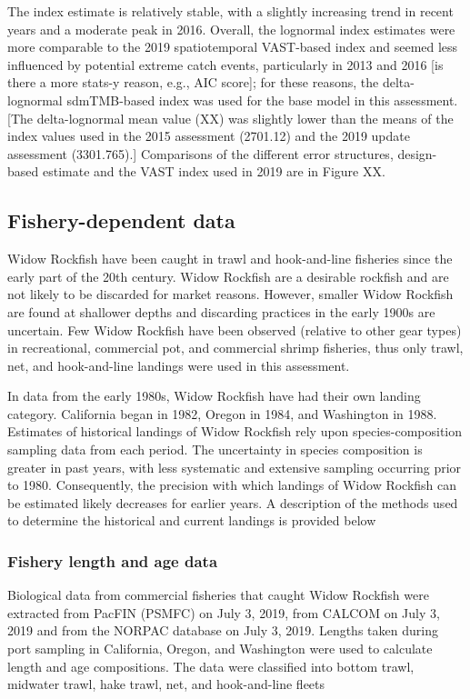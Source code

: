 \documentclass[
]{scrartcl}
\begin{document}
The index estimate is relatively stable, with a slightly increasing
trend in recent years and a moderate peak in 2016. Overall, the
lognormal index estimates were more comparable to the 2019
spatiotemporal VAST-based index and seemed less influenced by potential
extreme catch events, particularly in 2013 and 2016 {[}is there a more
stats-y reason, e.g., AIC score{]}; for these reasons, the
delta-lognormal sdmTMB-based index was used for the base model in this
assessment. {[}The delta-lognormal mean value (XX) was slightly lower
than the means of the index values used in the 2015 assessment (2701.12)
and the 2019 update assessment (3301.765).{]} Comparisons of the
different error structures, design-based estimate and the VAST index
used in 2019 are in Figure XX.

\subsection{Fishery-dependent data}\label{fishery-dependent-data}

Widow Rockfish have been caught in trawl and hook-and-line fisheries
since the early part of the 20th century. Widow Rockfish are a desirable
rockfish and are not likely to be discarded for market reasons. However,
smaller Widow Rockfish are found at shallower depths and discarding
practices in the early 1900s are uncertain. Few Widow Rockfish have been
observed (relative to other gear types) in recreational, commercial pot,
and commercial shrimp fisheries, thus only trawl, net, and hook-and-line
landings were used in this assessment.

In data from the early 1980s, Widow Rockfish have had their own landing
category. California began in 1982, Oregon in 1984, and Washington in
1988. Estimates of historical landings of Widow Rockfish rely upon
species-composition sampling data from each period. The uncertainty in
species composition is greater in past years, with less systematic and
extensive sampling occurring prior to 1980. Consequently, the precision
with which landings of Widow Rockfish can be estimated likely decreases
for earlier years. A description of the methods used to determine the
historical and current landings is provided below

\subsubsection{Fishery length and age
data}\label{fishery-length-and-age-data}

Biological data from commercial fisheries that caught Widow Rockfish
were extracted from PacFIN (PSMFC) on July 3, 2019, from CALCOM on July
3, 2019 and from the NORPAC database on July 3, 2019. Lengths taken
during port sampling in California, Oregon, and Washington were used to
calculate length and age compositions. The data were classified into
bottom trawl, midwater trawl, hake trawl, net, and hook-and-line fleets
\end{document}
